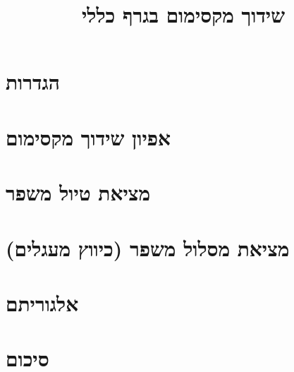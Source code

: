 \documentclass[]{article}
\title{שידוך מקסימום בגרף כללי}
\author{}
\date{}
\begin{document}
\maketitle

\section{הגדרות}

\section{אפיון שידוך מקסימום}

\section{מציאת טיול משפר}

\newpage
\section{
מציאת מסלול משפר (כיווץ מעגלים) 
}

\section{אלגוריתם}

\section{סיכום}

\end{document}
